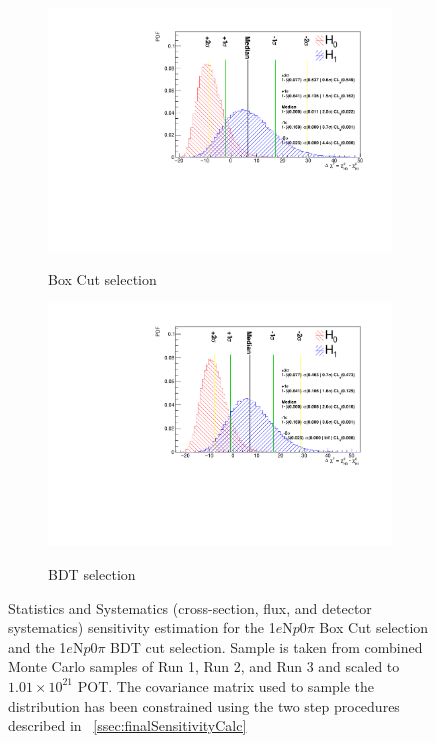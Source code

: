 \documentclass[a4paper]{article}
\newcommand{\npsel}{1$e$N$p$0$\pi$\xspace}
\begin{document}
\begin{figure}[H]
\begin{center}
    \begin{subfigure}[b]{0.48\textwidth}
    \centering
    \includegraphics[width=1.0\textwidth]{Sensitivity/BoxCut/SBNfit_Cls_nue_1e0p_numu_reco_e_H1_newboxcut_noCCMEC_constrained_detsys.pdf}
    \label{fig:1eNp_box_syst}
    \caption{Box Cut selection}
    \end{subfigure}
    \begin{subfigure}[b]{0.48\textwidth}
    \centering
    \includegraphics[width=1.0\textwidth]{Sensitivity/BDT_higheff/SBNfit_Cls_nue_1e0p_numu_reco_e_H1_newBDT_higheff_noCCMEC_constrained_detsys.pdf}
    \label{fig:1eNp_bdt_syst}
    \caption{BDT selection}
    \end{subfigure}
\caption{\label{fig:1eNp:statsystsensitivity} Statistics and Systematics (cross-section, flux, and detector systematics) sensitivity estimation for the \npsel Box Cut selection and the \npsel BDT cut selection. Sample is taken from combined Monte Carlo samples of Run 1, Run 2, and Run 3 and scaled to $1.01\times10^21$ POT. The covariance matrix used to sample the distribution has been constrained using the two step procedures described in ~\cref{ssec:finalSensitivityCalc}}
\end{center}
\end{figure}
\end{document}
